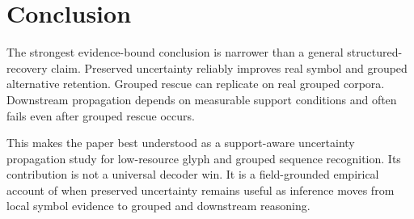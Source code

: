 \section{Conclusion}

The strongest evidence-bound conclusion is narrower than a general structured-recovery claim. Preserved uncertainty reliably improves real symbol and grouped alternative retention. Grouped rescue can replicate on real grouped corpora. Downstream propagation depends on measurable support conditions and often fails even after grouped rescue occurs.

This makes the paper best understood as a support-aware uncertainty propagation study for low-resource glyph and grouped sequence recognition. Its contribution is not a universal decoder win. It is a field-grounded empirical account of when preserved uncertainty remains useful as inference moves from local symbol evidence to grouped and downstream reasoning.
